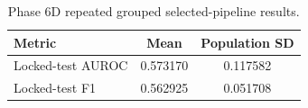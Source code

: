 \begin{table}[t]
\centering
\caption{Phase 6D repeated grouped selected-pipeline results.}
\begin{tabular}{lcc}
\hline
Metric & Mean & Population SD \\
\hline
Locked-test AUROC & 0.573170 & 0.117582 \\
Locked-test F1 & 0.562925 & 0.051708 \\
\hline
\end{tabular}
\label{tab:phase6d}
\end{table}
